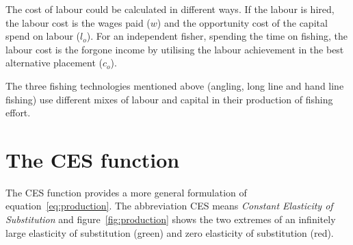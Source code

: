 \documentclass[11pt,fleqn]{book} %
\begin{document}
The cost of labour could be calculated in different ways. If the labour is hired, the labour cost is the wages paid ($w$) and the opportunity cost of the capital spend on labour ($l_o$). For an independent fisher, spending the time on fishing, the labour cost is the forgone income by utilising the labour achievement in the best alternative placement ($c_o$).

The three fishing technologies mentioned above (angling, long line and hand line fishing) use different mixes of labour and capital in their production of fishing effort.
\section{The CES function} \label{cesf}

The CES function provides a more general formulation of equation~\ref{eq:production}. The abbreviation CES means \textit{Constant Elasticity of Substitution} and figure~\ref{fig:production} shows the two extremes of an infinitely large elasticity of substitution (green) and zero elasticity of substitution (red).
\end{document}
